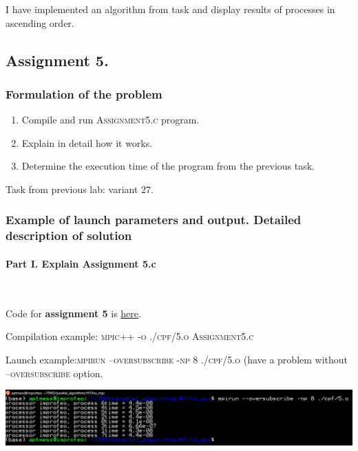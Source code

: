 \documentclass[%
12pt, %
final, %
oneside, %
onecolumn, %
centertags]{article} %
\theoremstyle{plain}
\theoremstyle{definition}
\theoremstyle{remark}
\begin{document}
I have implemented an algorithm from task and display results of processes in ascending order.

\newpage
\subsection{Assignment 5.}

\subsubsection{Formulation of the problem}

\begin{enumerate}
	\item Compile and run \textsc{Assignment5.c} program.
	\item Explain in detail how it works.
	\item Determine the execution time of the program from the previous task.
\end{enumerate}

Task from previous lab: variant $27$.

\subsubsection{Example of launch parameters and output. Detailed description of solution}

\paragraph{Part I. Explain Assignment 5.c}

$\ $

Code for \textbf{assignment 5} is \href{https:\//github.com/aptmess/parallel_algorithms/blob/master/HT/hw_mpi/Assignment5.c}{here}.

Compilation example: \textsc{mpic++ -o ./cpf/5.o Assignment5.c}

Launch example:\textsc{mpirun --oversubscribe -np 8 ./cpf/5.o} (have a problem without \textsc{--oversubscribe} option.

\begin{center}
\includegraphics[scale=0.55]{5.1.png}
\end{center}
\end{document}
